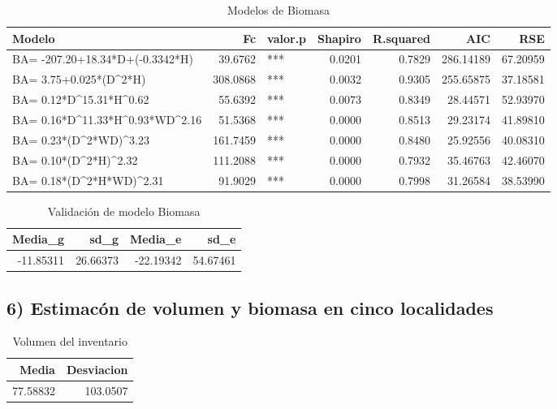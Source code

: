 \documentclass[9pt,onecolumn,twoside,]{pinp}
\begin{document}
\begin{table}

\caption{\label{tab:unnamed-chunk-24}Modelos de Biomasa}
\centering
\begin{tabular}[t]{l|r|l|r|r|r|r}
\hline
Modelo & Fc & valor.p & Shapiro & R.squared & AIC & RSE\\
\hline
BA= -207.20+18.34*D+(-0.3342*H) & 39.6762 & *** & 0.0201 & 0.7829 & 286.14189 & 67.20959\\
\hline
BA= 3.75+0.025*(D\textasciicircum{}2*H) & 308.0868 & *** & 0.0032 & 0.9305 & 255.65875 & 37.18581\\
\hline
BA= 0.12*D\textasciicircum{}15.31*H\textasciicircum{}0.62 & 55.6392 & *** & 0.0073 & 0.8349 & 28.44571 & 52.93970\\
\hline
BA= 0.16*D\textasciicircum{}11.33*H\textasciicircum{}0.93*WD\textasciicircum{}2.16 & 51.5368 & *** & 0.0000 & 0.8513 & 29.23174 & 41.89810\\
\hline
BA= 0.23*(D\textasciicircum{}2*WD)\textasciicircum{}3.23 & 161.7459 & *** & 0.0000 & 0.8480 & 25.92556 & 40.08310\\
\hline
BA= 0.10*(D\textasciicircum{}2*H)\textasciicircum{}2.32 & 111.2088 & *** & 0.0000 & 0.7932 & 35.46763 & 42.46070\\
\hline
BA= 0.18*(D\textasciicircum{}2*H*WD)\textasciicircum{}2.31 & 91.9029 & *** & 0.0000 & 0.7998 & 31.26584 & 38.53990\\
\hline
\end{tabular}
\end{table}

\begin{table}

\caption{\label{tab:unnamed-chunk-25}Validación de modelo Biomasa}
\centering
\begin{tabular}[t]{r|r|r|r}
\hline
Media\_g & sd\_g & Media\_e & sd\_e\\
\hline
-11.85311 & 26.66373 & -22.19342 & 54.67461\\
\hline
\end{tabular}
\end{table}

\hypertarget{estimacuxf3n-de-volumen-y-biomasa-en-cinco-localidades}{%
\subsection{6) Estimacón de volumen y biomasa en cinco
localidades}\label{estimacuxf3n-de-volumen-y-biomasa-en-cinco-localidades}}

\begin{table}

\caption{\label{tab:unnamed-chunk-29}Volumen del inventario}
\centering
\begin{tabular}[t]{r|r}
\hline
Media & Desviacion\\
\hline
77.58832 & 103.0507\\
\hline
\end{tabular}
\end{table}
\end{document}
